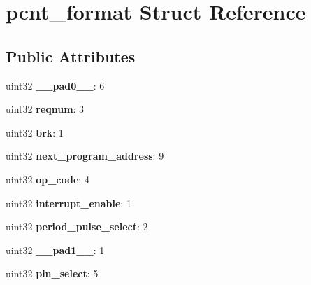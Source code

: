 \hypertarget{structpcnt__format}{}\section{pcnt\+\_\+format Struct Reference}
\label{structpcnt__format}
\subsection*{Public Attributes}
\begin{DoxyCompactItemize}
\item 
\mbox{\label{structpcnt__format_a8bd7421c4af5fd860fce50bb88ab273a}} 
uint32 {\bfseries \+\_\+\+\_\+pad0\+\_\+\+\_\+}\+: 6
\item 
\mbox{\label{structpcnt__format_aa948a03663ef1d7351a03c4bbfb6cd22}} 
uint32 {\bfseries reqnum}\+: 3
\item 
\mbox{\label{structpcnt__format_a69f9ca4ac2b47f0a06be8bb16200f3f3}} 
uint32 {\bfseries brk}\+: 1
\item 
\mbox{\label{structpcnt__format_a076532f97c64d2798cf4e596e62a248d}} 
uint32 {\bfseries next\+\_\+program\+\_\+address}\+: 9
\item 
\mbox{\label{structpcnt__format_ae786bf625da18cb52d7a53a9ed16e34d}} 
uint32 {\bfseries op\+\_\+code}\+: 4
\item 
\mbox{\label{structpcnt__format_a18ea59daa20bd9b3c0ef75f8e7ef759c}} 
uint32 {\bfseries interrupt\+\_\+enable}\+: 1
\item 
\mbox{\label{structpcnt__format_a71970a052b3dc9ae97902ff4619ffb2c}} 
uint32 {\bfseries period\+\_\+pulse\+\_\+select}\+: 2
\item 
\mbox{\label{structpcnt__format_aa77ebe93df61cbac99992f648ed2f252}} 
uint32 {\bfseries \+\_\+\+\_\+pad1\+\_\+\+\_\+}\+: 1
\item 
\mbox{\label{structpcnt__format_a531d834003fe1a0dee4058aa4f0f0ebb}} 
uint32 {\bfseries pin\+\_\+select}\+: 5

\end{DoxyCompactItemize}
